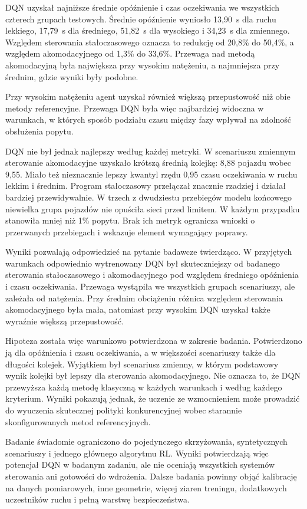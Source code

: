 DQN uzyskał najniższe średnie opóźnienie i czas oczekiwania we wszystkich czterech grupach testowych. Średnie opóźnienie wyniosło 13,90~s dla ruchu lekkiego, 17,79~s dla średniego, 51,82~s dla wysokiego i 34,23~s dla zmiennego. Względem sterowania stałoczasowego oznacza to redukcję od 20,8\% do 50,4\%, a względem akomodacyjnego od 1,3\% do 33,6\%. Przewaga nad metodą akomodacyjną była największa przy wysokim natężeniu, a najmniejsza przy średnim, gdzie wyniki były podobne.

Przy wysokim natężeniu agent uzyskał również większą przepustowość niż obie metody referencyjne. Przewaga DQN była więc najbardziej widoczna w warunkach, w których sposób podziału czasu między fazy wpływał na zdolność obsłużenia popytu.

DQN nie był jednak najlepszy według każdej metryki. W scenariuszu zmiennym sterowanie akomodacyjne uzyskało krótszą średnią kolejkę: 8,88 pojazdu wobec 9,55. Miało też nieznacznie lepszy kwantyl rzędu 0,95 czasu oczekiwania w ruchu lekkim i średnim. Program stałoczasowy przełączał znacznie rzadziej i działał bardziej przewidywalnie. W trzech z dwudziestu przebiegów modelu końcowego niewielka grupa pojazdów nie opuściła sieci przed limitem. W każdym przypadku stanowiła mniej niż 1\% popytu. Brak ich metryk ogranicza wnioski o przerwanych przebiegach i wskazuje element wymagający poprawy.

\label{subsec:odpowiedz-badawcza}

Wyniki pozwalają odpowiedzieć na pytanie badawcze twierdząco. W przyjętych warunkach odpowiednio wytrenowany DQN był skuteczniejszy od badanego sterowania stałoczasowego i akomodacyjnego pod względem średniego opóźnienia i czasu oczekiwania. Przewaga wystąpiła we wszystkich grupach scenariuszy, ale zależała od natężenia. Przy średnim obciążeniu różnica względem sterowania akomodacyjnego była mała, natomiast przy wysokim DQN uzyskał także wyraźnie większą przepustowość.

Hipoteza została więc warunkowo potwierdzona w zakresie badania. Potwierdzono ją dla opóźnienia i czasu oczekiwania, a w większości scenariuszy także dla długości kolejek. Wyjątkiem był scenariusz zmienny, w którym podstawowy wynik kolejki był lepszy dla sterowania akomodacyjnego. Nie oznacza to, że DQN przewyższa każdą metodę klasyczną w każdych warunkach i według każdego kryterium. Wyniki pokazują jednak, że uczenie ze wzmocnieniem może prowadzić do wyuczenia skutecznej polityki konkurencyjnej wobec starannie skonfigurowanych metod referencyjnych.

Badanie świadomie ograniczono do pojedynczego skrzyżowania, syntetycznych scenariuszy i jednego głównego algorytmu RL. Wyniki potwierdzają więc potencjał DQN w badanym zadaniu, ale nie oceniają wszystkich systemów sterowania ani gotowości do wdrożenia. Dalsze badania powinny objąć kalibrację na danych pomiarowych, inne geometrie, więcej ziaren treningu, dodatkowych uczestników ruchu i pełną warstwę bezpieczeństwa.
